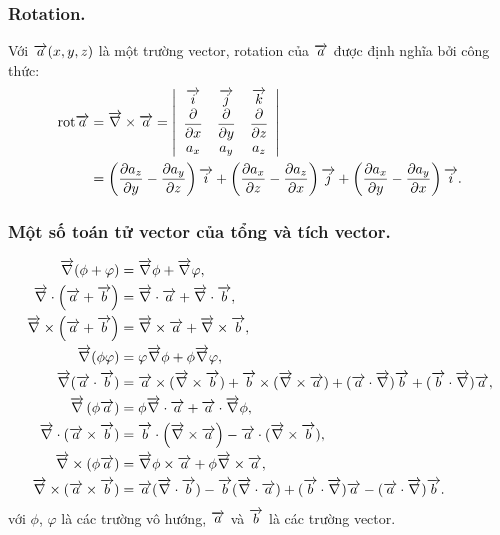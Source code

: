 \begin{appendices}
\subsubsection{Rotation.}
Với $\ot{a}(x,y,z)$ là một trường vector, rotation của $\ot{a}$ được định nghĩa bởi công thức:
\begin{align*}
    \text{rot}\ot{a}&=\ot{\nabla}\times\ot{a}=\left|\begin{array}{ccc}
    \ot{i} & \ot{j} & \ot{k} \\
    \dfrac{\partial}{\partial x} & \dfrac{\partial}{\partial y} & \dfrac{\partial}{\partial z} \\
    a_x & a_y & a_z 
    \end{array}\right|\\
    &=\left(\dfrac{\partial a_z}{\partial y}-\dfrac{\partial a_y}{\partial z}\right)\ot{i}+\left(\dfrac{\partial a_x}{\partial z}-\dfrac{\partial a_z}{\partial x}\right)\ot{j}+\left(\dfrac{\partial a_x}{\partial y}-\dfrac{\partial a_y}{\partial x}\right)\ot{i}.
\end{align*}
\subsubsection{Một số toán tử vector của tổng và tích vector.}
\begin{align*}
    \ot{\nabla}(\phi+\varphi)&=\ot{\nabla}\phi+\ot{\nabla}\varphi,\\
    \ot{\nabla}\cdot\left(\ot{a}+\ot{b}\right)&=
    \ot{\nabla}\cdot\ot{a}+\ot{\nabla}\cdot\ot{b},\\
    \ot{\nabla}\times\left(\ot{a}+\ot{b}\right)&=\ot{\nabla}\times\ot{a}+\ot{\nabla}\times\ot{b},\\
    \ot{\nabla}(\phi\varphi)&=\varphi\ot{\nabla}\phi+\phi\ot{\nabla}\varphi,\\
    \ot{\nabla}(\ot{a}\cdot\ot{b})&=\ot{a}\times(\ot{\nabla}\times\ot{b})+\ot{b}\times(\ot{\nabla}\times\ot{a})+(\ot{a}\cdot\ot{\nabla})\ot{b}+(\ot{b}\cdot\ot{\nabla})\ot{a},\\
    \ot{\nabla}\left(\phi\ot{a}\right)&=\phi\ot{\nabla}\cdot\ot{a}+\ot{a}\cdot\ot{\nabla}\phi,\\
    \ot{\nabla}\cdot(\ot{a}\times\ot{b})&=\ot{b}\cdot\left(\ot{\nabla}\times\ot{a}\right)-\ot{a}\cdot(\ot{\nabla}\times\ot{b}),\\
    \ot{\nabla}\times\left(\phi\ot{a}\right)&=\ot{\nabla}\phi\times\ot{a}+\phi\ot{\nabla}\times\ot{a},\\
    \ot{\nabla}\times(\ot{a}\times\ot{b})&=\ot{a}(\ot{\nabla}\cdot\ot{b})-\ot{b}(\ot{\nabla}\cdot\ot{a})+(\ot{b}\cdot\ot{\nabla})\ot{a}-(\ot{a}\cdot\ot{\nabla})\ot{b}.
\end{align*}
với $\phi$, $\varphi$ là các trường vô hướng, $\ot{a}$ và $\ot{b}$ là các trường vector.

\end{appendices}
